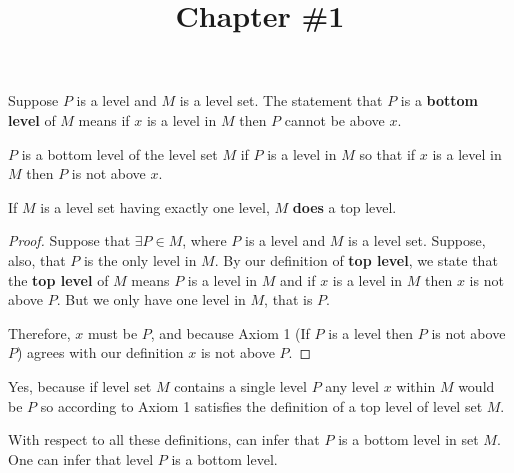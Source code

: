 

\title{Chapter \#1}

\newtheorem{conjecture}{Conjecture}

\setcounter{tocdepth}{1}
\setcounter{secnumdepth}{1}


\maketitle

\problem
Suppose $P$ is a level and $M$ is a level set. The statement that $P$ is a \textbf{bottom level} of $M$ means if $x$ is a level in $M$ then $P$ cannot be above $x$.

\solutionAlt
$P$ is a bottom level of the level set $M$ if $P$ is a level in $M$ so that if $x$ is a level in $M$ then $P$ is not above $x$.


\problem
\begin{theorem}
    If $M$ is a level set having exactly one level, $M$ \textbf{does} a top level.
\end{theorem}

\begin{proof}
    Suppose that $\exists P \in M$, where $P$ is a level and $M$ is a level set. Suppose, also, that $P$ is the only level in $M$. By our definition of \textbf{top level}, we state that the \textbf{top level} of $M$ means $P$ is a level in $M$ and if $x$ is a level in $M$ then $x$ is not above $P$. But we only have one level in $M$, that is $P$.

    Therefore, $x$ must be $P$, and because Axiom 1 (If $P$ is a level then $P$ is not above $P$) agrees with our definition $x$ is not above $P$.
\end{proof}

\solutionAlt
Yes, because if level set $M$ contains a single level $P$ any level $x$ within $M$ would be $P$ so according to Axiom 1 satisfies the definition of a top level of level set $M$.


\problem
With respect to all these definitions, can infer that $P$ is a bottom level in set $M$. One can infer that level $P$ is a bottom level.


